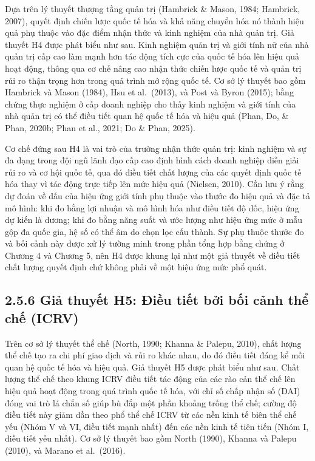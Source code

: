 \documentclass[
  a4paper,
  13pt]{extreport}
\begin{document}
Dựa trên lý thuyết thượng tầng quản trị (Hambrick \& Mason, 1984;
Hambrick, 2007), quyết định chiến lược quốc tế hóa và khả năng chuyển
hóa nó thành hiệu quả phụ thuộc vào đặc điểm nhận thức và kinh nghiệm
của nhà quản trị. Giả thuyết H4 được phát biểu như sau. Kinh nghiệm quản
trị và giới tính nữ của nhà quản trị cấp cao làm mạnh hơn tác động tích
cực của quốc tế hóa lên hiệu quả hoạt động, thông qua cơ chế nâng cao
nhận thức chiến lược quốc tế và quản trị rủi ro thận trọng hơn trong quá
trình mở rộng quốc tế. Cơ sở lý thuyết bao gồm Hambrick và Mason (1984),
Hsu et al.~(2013), và Post và Byron (2015); bằng chứng thực nghiệm ở cấp
doanh nghiệp cho thấy kinh nghiệm và giới tính của nhà quản trị có thể
điều tiết quan hệ quốc tế hóa và hiệu quả (Phan, Do, \& Phan, 2020b;
Phan et al., 2021; Do \& Phan, 2025).

Cơ chế đứng sau H4 là vai trò của trường nhận thức quản trị: kinh nghiệm
và sự đa dạng trong đội ngũ lãnh đạo cấp cao định hình cách doanh nghiệp
diễn giải rủi ro và cơ hội quốc tế, qua đó điều tiết chất lượng của các
quyết định quốc tế hóa thay vì tác động trực tiếp lên mức hiệu quả
(Nielsen, 2010). Cần lưu ý rằng dự đoán về dấu của hiệu ứng giới tính
phụ thuộc vào thước đo hiệu quả và đặc tả mô hình: khi đo bằng lợi nhuận
và mô hình hóa như điều tiết độ dốc, hiệu ứng dự kiến là dương; khi đo
bằng năng suất và ước lượng như hiệu ứng mức ở mẫu gộp đa quốc gia, hệ
số có thể âm do chọn lọc cấu thành. Sự phụ thuộc thước đo và bối cảnh
này được xử lý tường minh trong phần tổng hợp bằng chứng ở Chương 4 và
Chương 5, nên H4 được khung lại như một giả thuyết về điều tiết chất
lượng quyết định chứ không phải về một hiệu ứng mức phổ quát.

\hypertarget{giux1ea3-thuyux1ebft-h5-ux111iux1ec1u-tiux1ebft-bux1edfi-bux1ed1i-cux1ea3nh-thux1ec3-chux1ebf-icrv}{%
\subsection{2.5.6 Giả thuyết H5: Điều tiết bởi bối cảnh thể chế
(ICRV)}\label{giux1ea3-thuyux1ebft-h5-ux111iux1ec1u-tiux1ebft-bux1edfi-bux1ed1i-cux1ea3nh-thux1ec3-chux1ebf-icrv}}

Trên cơ sở lý thuyết thể chế (North, 1990; Khanna \& Palepu, 2010), chất
lượng thể chế tạo ra chi phí giao dịch và rủi ro khác nhau, do đó điều
tiết đáng kể mối quan hệ quốc tế hóa và hiệu quả. Giả thuyết H5 được
phát biểu như sau. Chất lượng thể chế theo khung ICRV điều tiết tác động
của các rào cản thể chế lên hiệu quả hoạt động trong quá trình quốc tế
hóa, với chỉ số chấp nhận số (DAI) đóng vai trò lá chắn số giúp bù đắp
một phần khoảng trống thể chế; cường độ điều tiết này giảm dần theo phổ
thể chế ICRV từ các nền kinh tế biên thể chế yếu (Nhóm V và VI, điều
tiết mạnh nhất) đến các nền kinh tế tiên tiến (Nhóm I, điều tiết yếu
nhất). Cơ sở lý thuyết bao gồm North (1990), Khanna và Palepu (2010), và
Marano et al.~(2016).
\end{document}
